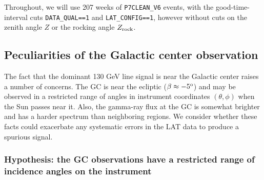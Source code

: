 \documentclass[aps,twocolumn,prd,superscriptaddress,showpacs,nofootinbib,fixfloat]{revtex4}
\newcommand{\degree}{^{\rm o}}
\newcommand{\zrock}{$Z_{\rm rock}$}
\begin{document}
Throughout, we will use 207 weeks of \texttt{P7CLEAN\_V6} events, with the
good-time-interval cuts \texttt{DATA\_QUAL==1} and \texttt{LAT\_CONFIG==1},
however without cuts on the zenith angle $Z$ or the rocking angle \zrock. 

\subsection{Peculiarities of the Galactic center observation}

The fact that the dominant 130 GeV line signal is near the Galactic center
raises a number of concerns.  The GC is near the ecliptic ($\beta \approx
-5\degree$) and may be observed in a restricted range of angles in instrument
coordinates $(\theta, \phi)$ when the Sun passes near it.  Also, the gamma-ray
flux at the GC is somewhat brighter and has a harder spectrum than neighboring
regions.  We consider whether these facts could exacerbate any systematic
errors in the LAT data to produce a spurious signal.

\subsubsection{Hypothesis: the GC observations have a restricted range of
incidence angles on the instrument}
\end{document}

